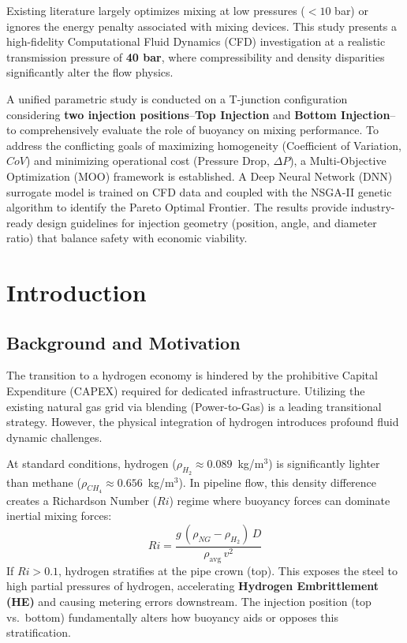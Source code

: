 \documentclass[12pt, a4paper]{report}
\begin{document}
Existing literature largely optimizes mixing at low pressures ($<10$ bar) or ignores the energy penalty associated with mixing devices. This study presents a high-fidelity Computational Fluid Dynamics (CFD) investigation at a realistic transmission pressure of \textbf{40 bar}, where compressibility and density disparities significantly alter the flow physics.

A unified parametric study is conducted on a T-junction configuration considering \textbf{two injection positions}--\textbf{Top Injection} and \textbf{Bottom Injection}--to comprehensively evaluate the role of buoyancy on mixing performance. To address the conflicting goals of maximizing homogeneity (Coefficient of Variation, $CoV$) and minimizing operational cost (Pressure Drop, $\Delta P$), a Multi-Objective Optimization (MOO) framework is established. A Deep Neural Network (DNN) surrogate model is trained on CFD data and coupled with the NSGA-II genetic algorithm to identify the Pareto Optimal Frontier. The results provide industry-ready design guidelines for injection geometry (position, angle, and diameter ratio) that balance safety with economic viability.

\tableofcontents
\listoftables
\listoffigures

\chapter{Introduction}

\section{Background and Motivation}
The transition to a hydrogen economy is hindered by the prohibitive Capital Expenditure (CAPEX) required for dedicated infrastructure. Utilizing the existing natural gas grid via blending (Power-to-Gas) is a leading transitional strategy. However, the physical integration of hydrogen introduces profound fluid dynamic challenges.

At standard conditions, hydrogen ($\rho_{H_2} \approx 0.089$~kg/m$^3$) is significantly lighter than methane ($\rho_{CH_4} \approx 0.656$~kg/m$^3$). In pipeline flow, this density difference creates a Richardson Number ($Ri$) regime where buoyancy forces can dominate inertial mixing forces:
\begin{equation}
    Ri = \frac{g \, (\rho_{NG} - \rho_{H_2}) \, D}{\rho_{\text{avg}} \, v^2}
\end{equation}
If $Ri > 0.1$, hydrogen stratifies at the pipe crown (top). This exposes the steel to high partial pressures of hydrogen, accelerating \textbf{Hydrogen Embrittlement (HE)} and causing metering errors downstream. The injection position (top vs.\ bottom) fundamentally alters how buoyancy aids or opposes this stratification.
\end{document}
